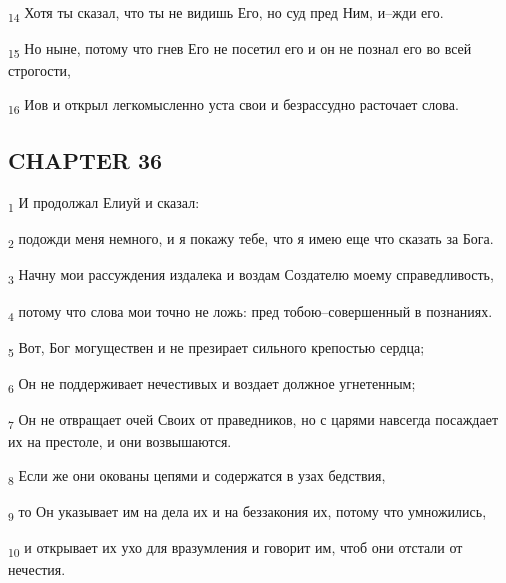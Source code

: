 \begin{tcolorbox}
\textsubscript{14} Хотя ты сказал, что ты не видишь Его, но суд пред Ним, и--жди его.
\end{tcolorbox}
\begin{tcolorbox}
\textsubscript{15} Но ныне, потому что гнев Его не посетил его и он не познал его во всей строгости,
\end{tcolorbox}
\begin{tcolorbox}
\textsubscript{16} Иов и открыл легкомысленно уста свои и безрассудно расточает слова.
\end{tcolorbox}
\subsection{CHAPTER 36}
\begin{tcolorbox}
\textsubscript{1} И продолжал Елиуй и сказал:
\end{tcolorbox}
\begin{tcolorbox}
\textsubscript{2} подожди меня немного, и я покажу тебе, что я имею еще что сказать за Бога.
\end{tcolorbox}
\begin{tcolorbox}
\textsubscript{3} Начну мои рассуждения издалека и воздам Создателю моему справедливость,
\end{tcolorbox}
\begin{tcolorbox}
\textsubscript{4} потому что слова мои точно не ложь: пред тобою--совершенный в познаниях.
\end{tcolorbox}
\begin{tcolorbox}
\textsubscript{5} Вот, Бог могуществен и не презирает сильного крепостью сердца;
\end{tcolorbox}
\begin{tcolorbox}
\textsubscript{6} Он не поддерживает нечестивых и воздает должное угнетенным;
\end{tcolorbox}
\begin{tcolorbox}
\textsubscript{7} Он не отвращает очей Своих от праведников, но с царями навсегда посаждает их на престоле, и они возвышаются.
\end{tcolorbox}
\begin{tcolorbox}
\textsubscript{8} Если же они окованы цепями и содержатся в узах бедствия,
\end{tcolorbox}
\begin{tcolorbox}
\textsubscript{9} то Он указывает им на дела их и на беззакония их, потому что умножились,
\end{tcolorbox}
\begin{tcolorbox}
\textsubscript{10} и открывает их ухо для вразумления и говорит им, чтоб они отстали от нечестия.
\end{tcolorbox}
